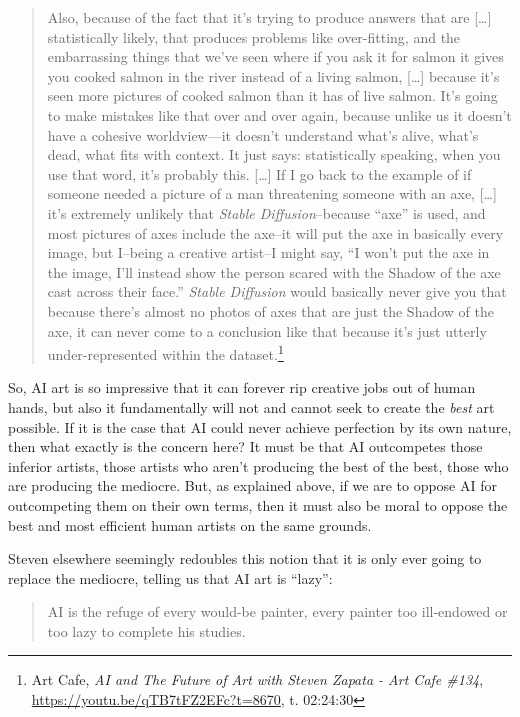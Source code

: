 \documentclass[11pt]{article}
\begin{document}
\begin{quote}
Also, because of the fact that it's trying to produce answers that are [\ldots{}] statistically likely, that produces problems like over-fitting, and the embarrassing things that we've seen where if you ask it for salmon it gives you cooked salmon in the river instead of a living salmon, [\ldots{}] because it's seen more pictures of cooked salmon than it has of live salmon. It's going to make mistakes like that over and over again, because unlike us it doesn't have a cohesive worldview---it doesn't understand what's alive, what's dead, what fits with context. It just says: statistically speaking, when you use that word, it's probably this. [\ldots{}] If I go back to the example of if someone needed a picture of a man threatening someone with an axe, [\ldots{}] it's extremely unlikely that \emph{Stable Diffusion}--because ``axe'' is used, and most pictures of axes include the axe--it will put the axe in basically every image, but I--being a creative artist--I might say, ``I won't put the axe in the image, I'll instead show the person scared with the Shadow of the axe cast across their face.'' \emph{Stable Diffusion} would basically never give you that because there's almost no photos of axes that are just the Shadow of the axe, it can never come to a conclusion like that because it's just utterly under-represented within the dataset.\footnote{Art Cafe, \emph{AI and The Future of Art with Steven Zapata - Art Cafe \#134}, \url{https://youtu.be/qTB7tFZ2EFc?t=8670}, t. 02:24:30}
\end{quote}

So, AI art is so impressive that it can forever rip creative jobs out of human hands, but also it fundamentally will not and cannot seek to create the \emph{best} art possible. If it is the case that AI could never achieve perfection by its own nature, then what exactly is the concern here? It must be that AI outcompetes those inferior artists, those artists who aren't producing the best of the best, those who are producing the mediocre. But, as explained above, if we are to oppose AI for outcompeting them on their own terms, then it must also be moral to oppose the best and most efficient human artists on the same grounds.

Steven elsewhere seemingly redoubles this notion that it is only ever going to replace the mediocre, telling us that AI art is ``lazy'':
\begin{quote}
AI is the refuge of every would-be painter, every painter too ill-endowed or too lazy to complete his studies.
\end{quote}
\end{document}
